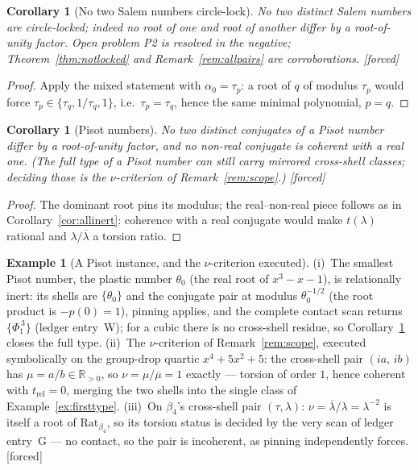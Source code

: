 \documentclass[11pt]{article}
\theoremstyle{plain}
\newtheorem{corollary}[theorem]{Corollary}
\theoremstyle{definition}
\newtheorem{example}[theorem]{Example}
\theoremstyle{remark}
\newcommand{\R}{\mathbb{R}}
\newcommand{\Rat}{\mathrm{Rat}}
\newcommand{\F}{\textnormal{[forced]}}
\begin{document}
\begin{corollary}[No two Salem numbers circle-lock]\label{cor:nolock}
No two distinct Salem numbers are circle-locked; indeed no root of one and
root of another differ by a root-of-unity factor. Open problem P2 is
resolved in the negative; Theorem~\ref{thm:notlocked} and
Remark~\ref{rem:allpairs} are corroborations. \F
\end{corollary}

\begin{proof}
Apply the mixed statement with $\alpha_0=\tau_p$: a root of $q$ of modulus
$\tau_p$ would force $\tau_p\in\{\tau_q,1/\tau_q,1\}$, i.e.\
$\tau_p=\tau_q$, hence the same minimal polynomial, $p=q$.
\end{proof}

\begin{corollary}[Pisot numbers]\label{cor:pisot}
No two distinct conjugates of a Pisot number differ by a root-of-unity
factor, and no non-real conjugate is coherent with a real one. (The full
type of a Pisot number can still carry mirrored cross-shell classes;
deciding those is the $\nu$-criterion of Remark~\ref{rem:scope}.) \F
\end{corollary}

\begin{proof}
The dominant root pins its modulus; the real--non-real piece follows as in
Corollary~\ref{cor:allinert}: coherence with a real conjugate would make
$t(\lambda)$ rational and $\lambda/\overline{\lambda}$ a torsion ratio.
\end{proof}

\begin{example}[A Pisot instance, and the $\nu$-criterion executed]
\label{ex:pisotnu}
(i)~The smallest Pisot number, the plastic number $\theta_0$ (the real root
of $x^3-x-1$), is relationally inert: its shells are $\{\theta_0\}$ and the
conjugate pair at modulus $\theta_0^{-1/2}$ (the root product is $-p(0)=1$),
pinning applies, and the complete contact scan returns $\{\Phi_1^{\,3}\}$
(ledger entry~W); for a cubic there is no cross-shell residue, so
Corollary~\ref{cor:pisot} closes the full type. (ii)~The $\nu$-criterion of
Remark~\ref{rem:scope}, executed symbolically on the group-drop quartic
$x^4+5x^2+5$: the cross-shell pair $(ia,\,ib)$ has $\mu=a/b\in\R_{>0}$, so
$\nu=\mu/\overline{\mu}=1$ exactly --- torsion of order $1$, hence coherent
with $t_{\mathrm{rel}}=0$, merging the two shells into the single class of
Example~\ref{ex:firsttype}. (iii)~On $\beta_4$'s cross-shell pair
$(\tau,\lambda)$: $\nu=\overline{\lambda}/\lambda=\lambda^{-2}$ is itself a
root of $\Rat_{\beta_4}$, so its torsion status is decided by the very scan
of ledger entry~G --- no contact, so the pair is incoherent, as pinning
independently forces. \F
\end{example}
\end{document}
